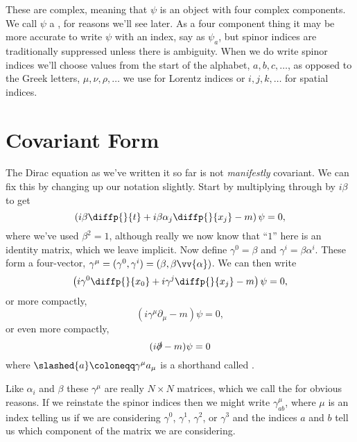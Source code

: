 \documentclass[fleqn]{NotesClass}
\begin{document}
    These are complex, meaning that \(\psi\) is an object with four complex components.
    We call \(\psi\) a , for reasons we'll see later.
    As a four component thing it may be more accurate to write \(\psi\) with an index, say as \(\psi_a\), but spinor indices are traditionally suppressed unless there is ambiguity.
    When we do write spinor indices we'll choose values from the start of the alphabet, \(a, b, c, \dotsc\), as opposed to the Greek letters, \(\mu, \nu, \rho, \dotsc\) we use for Lorentz indices or \(i, j, k, \dotsc\) for spatial indices.
    
    \section{Covariant Form}
    The Dirac equation as we've written it so far is not \emph{manifestly} covariant.
    We can fix this by changing up our notation slightly.
    Start by multiplying through by \(i\beta\) to get
    \begin{equation}
        \left( i\beta\diffp{}{t} + i\beta\alpha_j\diffp{}{x_j} - m \right) \psi = 0,
    \end{equation}
    where we've used \(\beta^2 = 1\), although really we now know that \enquote{\(1\)} here is an identity matrix, which we leave implicit.
    Now define \(\gamma^0 = \beta\) and \(\gamma^i = \beta \alpha^i\).
    These form a four-vector, \(\gamma^\mu = (\gamma^0, \gamma^i) = (\beta, \beta\vv{\alpha})\).
    We can then write
    \begin{equation}
        \left( i\gamma^0 \diffp{}{x_0} + i\gamma^j \diffp{}{x_j} - m \right) \psi = 0,
    \end{equation}
    or more compactly,
    \begin{equation}
        (i\gamma^\mu \partial_\mu - m)\psi = 0,
    \end{equation}
    or even more compactly,
    \begin{equation}
        (i\slashed{\partial} - m)\psi = 0
    \end{equation}
    where \(\slashed{a} \coloneqq \gamma^\mu a_\mu\) is a shorthand called .

    Like \(\alpha_i\) and \(\beta\) these \(\gamma^\mu\) are really \(N \times N\) matrices, which we call the  for obvious reasons.
    If we reinstate the spinor indices then we might write \(\gamma^\mu_{ab}\), where \(\mu\) is an index telling us if we are considering \(\gamma^0\), \(\gamma^1\), \(\gamma^2\), or \(\gamma^3\) and the indices \(a\) and \(b\) tell us which component of the matrix we are considering.
    
\end{document}
